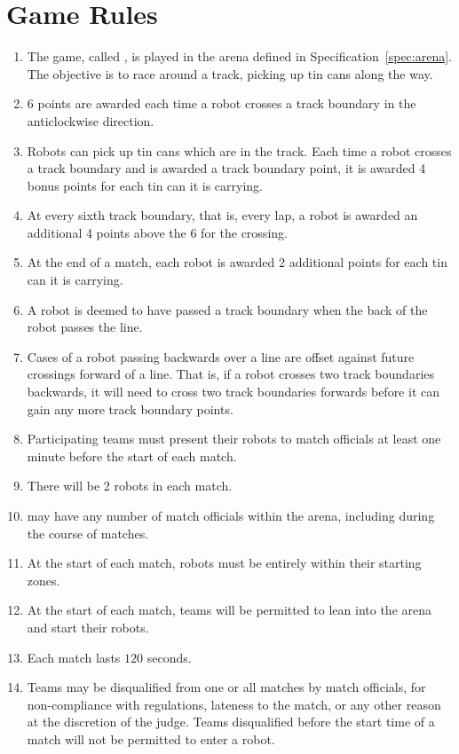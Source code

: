 \section{Game Rules}
\label{sec:rules}

\begin{enumerate}
  \item The game, called \emph{\gamename}, is played in the arena defined in
        Specification~\ref{spec:arena}. The objective is to race around a
        track, picking up tin cans along the way.
  \item 6 points are awarded each time a robot crosses a track boundary in the
        anticlockwise direction.
  \item Robots can pick up tin cans which are in the track. Each time a robot
        crosses a track boundary and is awarded a track boundary point, it is
        awarded 4 bonus points for each tin can it is carrying.
  \item At every sixth track boundary, that is, every lap, a robot is awarded
        an additional 4 points above the 6 for the crossing.
  \item At the end of a match, each robot is awarded 2 additional points for
        each tin can it is carrying.
  \item A robot is deemed to have passed a track boundary when the back of the
        robot passes the line.
  \item Cases of a robot passing backwards over a line are offset against
        future crossings forward of a line. That is, if a robot crosses two
        track boundaries backwards, it will need to cross two track boundaries
        forwards before it can gain any more track boundary points.
  \item Participating teams must present their robots to match officials at
        least one minute before the start of each match.
  \item There will be 2 robots in each match.
  \item \org may have any number of match officials within the arena, including
        during the course of matches.
  \item At the start of each match, robots must be entirely within their
        starting zones.
  \item At the start of each match, teams will be permitted to lean into the
        arena and start their robots.
  \item Each match lasts $120$ seconds.
  \item Teams may be disqualified from one or all matches by match officials,
        for non-compliance with regulations, lateness to the match, or any other
        reason at the discretion of the judge. Teams disqualified before the
        start time of a match will not be permitted to enter a robot.
\end{enumerate}

